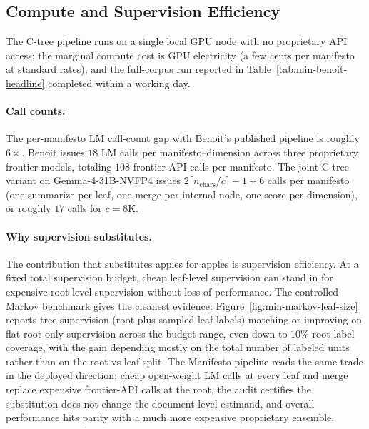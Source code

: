 \begin{table}[t]
\centering
\resizebox{\linewidth}{!}{}
\caption{\textbf{Per-cell best external Pearson, MAE, internal-external gap
for the $f/g$ ladder.} Benoit-init lane (top) fully populated across six
leaf sizes and five stages. Raw-init lane (bottom) covers leaves
$256$--$8096$ tokens at the $f^1 g^0$ and $f^1 g^1$ stages, plus deeper
cells where a later summarizer update changed the evaluation; inherited
(unchanged) stages are collapsed into the first stage at which each
distinct number appeared. Ext. $r$ is the correlation against the
held-out Benoit expert-survey mean; Int. $r$ is the correlation against
the (scorer-only) internal target; the gap is their difference.}
\label{tab:min-manifesto-ladder}
\end{table}

\subsection{Compute and Supervision Efficiency}\label{app:min-cost-comparison}

The C-tree pipeline runs on a single local GPU node with no proprietary
API access; the marginal compute cost is GPU electricity (a few cents
per manifesto at standard rates), and the full-corpus run reported in
Table~\ref{tab:min-benoit-headline} completed within a working day.

\paragraph{Call counts.} The per-manifesto LM call-count gap with
Benoit's published pipeline is roughly $6\times$. Benoit issues $18$
LM calls per manifesto--dimension across three proprietary frontier
models, totaling $108$ frontier-API calls per manifesto. The joint
C-tree variant on Gemma-4-31B-NVFP4 issues $2\lceil n_{\text{chars}}/c
\rceil - 1 + 6$ calls per manifesto (one summarize per leaf, one merge
per internal node, one score per dimension), or roughly $17$ calls for
$c = 8\mathrm{K}$.

\paragraph{Why supervision substitutes.} The contribution that
substitutes apples for apples is supervision efficiency. At a fixed
total supervision budget, cheap leaf-level supervision can stand in
for expensive root-level supervision without loss of performance. The
controlled Markov benchmark gives the cleanest evidence:
Figure~\ref{fig:min-markov-leaf-size} reports tree supervision (root
plus sampled leaf labels) matching or improving on flat root-only
supervision across the budget range, even down to $10\%$ root-label
coverage, with the gain depending mostly on the total number of
labeled units rather than on the root-vs-leaf split. The Manifesto
pipeline reads the same trade in the deployed direction: cheap
open-weight LM calls at every leaf and merge replace expensive
frontier-API calls at the root, the audit certifies the substitution
does not change the document-level estimand, and overall performance
hits parity with a much more expensive proprietary ensemble.

